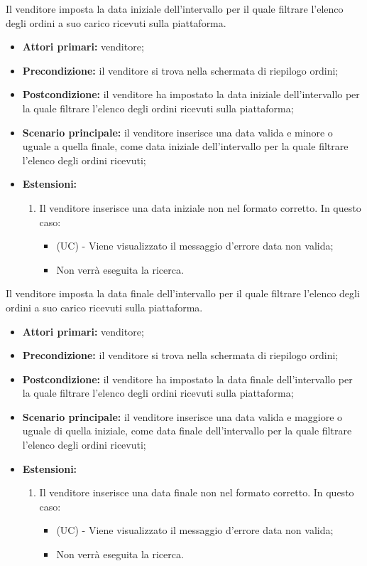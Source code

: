 \resetSubSubUC
{}
Il venditore imposta la data iniziale dell'intervallo per il quale filtrare l'elenco degli ordini a suo carico ricevuti sulla piattaforma.
\begin{itemize}
	\item \textbf{Attori primari:} venditore;
	\item \textbf{Precondizione:} il venditore si trova nella schermata di riepilogo ordini;
	\item \textbf{Postcondizione:} il venditore ha impostato la data iniziale dell'intervallo per la quale filtrare l'elenco degli ordini ricevuti sulla piattaforma;
	\item \textbf{Scenario principale:} il venditore inserisce una data valida e minore o uguale a quella finale, come data iniziale dell'intervallo per la quale filtrare l'elenco degli ordini ricevuti;
	\item \textbf{Estensioni:}
	\begin{enumerate}[label=\lett]
		\item Il venditore inserisce una data iniziale non nel formato corretto. In questo caso:
		\begin{itemize}
			\item (UC) - Viene visualizzato il messaggio d'errore data non valida;
			\item Non verrà eseguita la ricerca.
		\end{itemize} 
	\end{enumerate}
\end{itemize}

Il venditore imposta la data finale dell'intervallo per il quale filtrare l'elenco degli ordini a suo carico ricevuti sulla piattaforma.
\begin{itemize}
	\item \textbf{Attori primari:} venditore;
	\item \textbf{Precondizione:} il venditore si trova nella schermata di riepilogo ordini;
	\item \textbf{Postcondizione:} il venditore ha impostato la data finale dell'intervallo per la quale filtrare l'elenco degli ordini ricevuti sulla piattaforma;
	\item \textbf{Scenario principale:} il venditore inserisce una data valida e maggiore o uguale di quella iniziale, come data finale dell'intervallo per la quale filtrare l'elenco degli ordini ricevuti;
	\item \textbf{Estensioni:}
	\begin{enumerate}[label=\lett]
		\item Il venditore inserisce una data finale non nel formato corretto. In questo caso:
		\begin{itemize}
			\item (UC) - Viene visualizzato il messaggio d'errore data non valida;
			\item Non verrà eseguita la ricerca.
		\end{itemize}
	\end{enumerate}
\end{itemize}